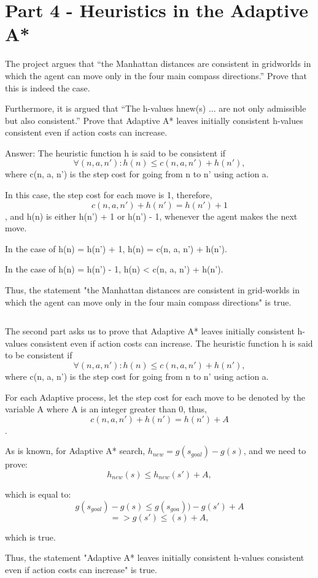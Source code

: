 \documentclass{article}
\begin{document}

\section{Part 4 - Heuristics in the Adaptive A*}

The project argues that “the Manhattan distances are consistent in
gridworlds in which the agent can move only in the four main compass directions.” Prove that this is indeed the case.

Furthermore, it is argued that “The h-values hnew(s) ... are not only admissible but also consistent.” Prove that Adaptive A*
leaves initially consistent h-values consistent even if action costs can increase.
\newline


Answer: \newline
The heuristic function h is said to be consistent if 
$$ \forall(n, a, n'): h(n) \leq c(n, a, n') + h(n'),$$
where c(n, a, n') is the step cost for going from n to n' using action a.
\par In this case, the step cost for each move is 1, therefore, $$c(n, a, n') + h(n') = h(n') + 1$$ , and h(n) is either h(n') + 1 or h(n') - 1, whenever the agent makes the next move. \par In the case of h(n) = h(n') + 1, h(n) = c(n, a, n') + h(n'). \par In the case of h(n) = h(n') - 1, h(n) < c(n, a, n') + h(n').
\par Thus, the statement "the Manhattan distances are consistent in grid-worlds in which the agent can move only in the four main compass directions" is true.



$$$$\par The second part asks us to prove that Adaptive A* leaves initially consistent h-values consistent even if action costs can increase. The heuristic function h is said to be consistent if 
$$ \forall(n, a, n'): h(n) \leq c(n, a, n') + h(n'),$$ where c(n, a, n') is the step cost for going from n to n' using action a.
\par For each Adaptive process, let the step cost for each move to be denoted by the variable A where A is an integer greater than 0, thus, $$c(n, a, n') + h(n') = h(n') + A$$ . 
\par As is known, for Adaptive A* search, $h_{new} = g(s_{goal}) - g(s)$, and we need to prove:
$$h_{new}(s) \leq h_{new}(s') + A,$$ 
\par which is equal to:
$$g(s_{goal}) - g(s) \leq g(s_{goa})) - g(s') + A$$
$$ => g(s') \leq (s) + A,$$ 
\par which is true.
\par Thus, the statement "Adaptive A* leaves initially consistent h-values consistent even if action costs can increase" is true.
\end{document}
